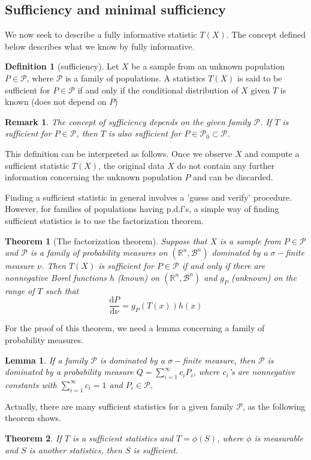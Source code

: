 \documentclass{article}
\newtheorem{Thm}{Theorem}[section]
\newtheorem{Lem}{Lemma}[section]
\newtheorem*{Rk}{Remark}
\theoremstyle{definition}
\newtheorem{Def}{Definition}[section]
\begin{document}
\subsection{Sufficiency and minimal sufficiency}
We now seek to describe a fully informative statistic $T(X)$. The concept defined below describes what we know by fully informative.
\begin{Def}[sufficiency]
Let $X$ be a sample from an unknown population $P\in\mathcal{P}$, where $\mathcal{P}$ is a family of populations. A statistics $T(X)$ is said to be sufficient for $P\in\mathcal{P}$ if and only if the conditional distribution of $X$ given $T$ is known (does not depend on $P$)
\end{Def}
\begin{Rk}
The concept of syfficiency depends on the given family $\mathcal{P}$. If $T$ is sufficient for $P\in\mathcal{P}$, then $T$ is also sufficient for $P\in\mathcal{P}_0\subset\mathcal{P}$.
\end{Rk}
This definition can be interpreted as follows. Once we observe $X$ and compute a sufficient statistic $T(X)$, the original data $X$ do not contain any further information concerning the unknown population $P$ and can be discarded.\par
Finding a sufficient statistic in general involves a 'guess and verify' procedure. However, for families of populations having p.d.f's, a simple way of finding sufficient statistics is to use the factorization theorem.
\begin{Thm}[The factorization theorem]
Suppose that $X$ is a sample from $P\in\mathcal{P}$ and $\mathcal{P}$ is a family of probability measures on $(\mathbb{R}^n,\mathcal{B}^n)$ dominated by a $\sigma-$finite measure $\nu$. Then $T(X)$ is sufficient for $P\in\mathcal{P}$ if and only if there are nonnegative Borel functions $h$ (known) on $(\mathbb{R}^n,\mathcal{B}^n)$ and $g_P$ (unknown) on the range of $T$ such that
\[\frac{\mathrm{d} P}{\mathrm{d} \nu} =g_P(T(x))h(x)\]
\end{Thm}
For the proof of this theorem, we need a lemma concerning a family of probability measures.
\begin{Lem}
If a family $\mathcal{P}$ is dominated by a $\sigma-$finite measure, then $\mathcal{P}$ is dominated by a probability measure $Q=\sum_{i=1}^\infty c_iP_i$, where $c_i$'s are nonnegative constants with $\sum_{i=1}^\infty c_i=1$ and $P_i\in\mathcal{P}$.
\end{Lem}


Actually, there are many sufficient statistics for a given family $\mathcal{P}$, as the following theorem shows.
\begin{Thm}
If $T$ is a sufficient statistics and $T=\phi(S)$, where $\phi$ is measurable and $S$ is another statistics, then $S$ is sufficient.
\end{Thm}
\end{document}
